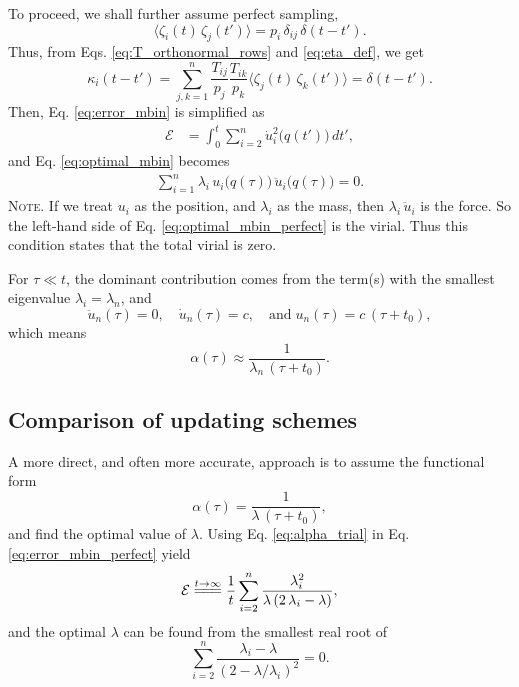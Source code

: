 \documentclass[reprint]{revtex4-1}
\newcommand{\note}[1]{{\color{DarkGreen}\footnotesize \textsc{Note.} #1}}
\begin{document}
To proceed, we shall further assume perfect sampling,
%
\begin{equation}
  \langle \zeta_i(t) \, \zeta_j(t') \rangle
  =
  p_i \, \delta_{ij} \, \delta(t - t').
  \label{eq:zz_perfect}
\end{equation}
%
Thus, from Eqs. \eqref{eq:T_orthonormal_rows} and \eqref{eq:eta_def},
we get
%
\begin{equation}
  \kappa_i(t - t')
  =
  \sum_{j,k = 1}^n
  \frac{ T_{ij} } { p_j }
  \frac{ T_{ik} } { p_k }
  \langle \zeta_j(t) \, \zeta_k(t') \rangle
  =
  \delta(t - t').
  \label{eq:kappa_perfect}
\end{equation}
%
Then, Eq. \eqref{eq:error_mbin} is simplified as
%
\begin{align}
  \mathcal E
  &=
  \int_0^t
  \sum_{i = 2}^n
  \dot u_i^2\bigl( q(t') \bigr) \, dt',
  \label{eq:error_mbin_perfect}
\end{align}
%
and Eq. \eqref{eq:optimal_mbin} becomes
%
\begin{align}
  \sum_{i=1}^n
  \lambda_i \, u_i\bigl( q(\tau) \bigr) \, \ddot u_i\bigl( q(\tau) \bigr) = 0.
  \label{eq:optimal_mbin_perfect}
\end{align}
%
\note{If we treat $u_i$ as the position,
  and $\lambda_i$ as the mass,
  then $\lambda_i \, \ddot u_i$ is the force.
  So the left-hand side of Eq. \eqref{eq:optimal_mbin_perfect}
  is the virial.
  Thus this condition states that the total virial is zero.
}



%
%
For $\tau \ll t$,
the dominant contribution comes from
the term(s) with the smallest eigenvalue $\lambda_i = \lambda_n$,
and
$$
\ddot u_n(\tau) = 0,
\quad
\dot u_n(\tau) = c,
\quad
\mathrm{and}\;
u_n(\tau) = c \, (\tau + t_0),
$$
which means
$$
\alpha(\tau) \approx \frac{1}{\lambda_n \, (\tau + t_0)}.
$$



\subsection{Comparison of updating schemes}



A more direct, and often more accurate, approach
is to assume the functional form
\begin{equation}
\alpha(\tau) = \frac{1}{\lambda \, (\tau + t_0) },
\label{eq:alpha_trial}
\end{equation}
and find the optimal value of $\lambda$.
%
Using Eq. \eqref{eq:alpha_trial}
in Eq. \eqref{eq:error_mbin_perfect} yield
%
\begin{equation}
\mathcal E
\stackrel{t \to \infty}
{=\joinrel=\joinrel=}
\frac{1}{t}
\sum_{i = 2}^n
\frac{ \lambda_i^2 } { \lambda \, (2 \, \lambda_i - \lambda) },
\label{eq:y2_sum_perfect_invt}
\end{equation}
%
and the optimal $\lambda$
can be found from the smallest real root of
%
\begin{equation}
\sum_{i = 2}^n
\frac{ \lambda_i - \lambda }
{ \left(2 - \lambda/ \lambda_i \right)^2 }
= 0.
\label{eq:optimal_lambda_approx}
\end{equation}
\end{document}
